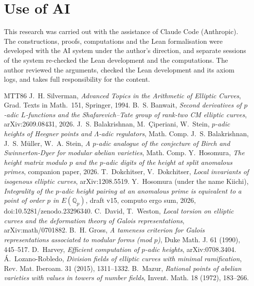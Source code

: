 \documentclass[11pt,a4paper]{amsart}
\newcommand{\Qp}{\mathbb{Q}_p}
\theoremstyle{plain}
\theoremstyle{definition}
\theoremstyle{remark}
\begin{document}
\section*{Use of AI}
This research was carried out with the assistance of Claude Code (Anthropic). The constructions, proofs, computations and the Lean formalisation were developed with the AI system under the author's direction, and separate sessions of the system re-checked the Lean development and the computations. The author reviewed the arguments, checked the Lean development and its axiom logs, and takes full responsibility for the content.

\begin{thebibliography}{MTT86}
 J.~H. Silverman, \emph{Advanced Topics in the Arithmetic of Elliptic Curves}, Grad. Texts in Math.~151, Springer, 1994.
 B.~S. Banwait, \emph{Second derivatives of $p$-adic $L$-functions and the Shafarevich--Tate group of rank-two CM elliptic curves}, arXiv:2609.08431, 2026.
 J.~S. Balakrishnan, M.~\c{C}iperiani, W.~Stein, \emph{$p$-adic heights of Heegner points and $\Lambda$-adic regulators}, Math. Comp.
 J.~S. Balakrishnan, J.~S. M\"uller, W.~A. Stein, \emph{A $p$-adic analogue of the conjecture of Birch and Swinnerton-Dyer for modular abelian varieties}, Math. Comp.
 Y.~Hosomura, \emph{The height matrix modulo $p$ and the $p$-adic digits of the height at split anomalous primes}, companion paper, 2026.
 T.~Dokchitser, V.~Dokchitser, \emph{Local invariants of isogenous elliptic curves}, arXiv:1208.5519.
 Y.~Hosomura (under the name Kiichi), \emph{Integrality of the $p$-adic height pairing at an anomalous prime is equivalent to a point of order $p$ in $E(\Qp)$}, draft v15, computo ergo sum, 2026, doi:10.5281/zenodo.23296340.
 C.~David, T.~Weston, \emph{Local torsion on elliptic curves and the deformation theory of Galois representations}, arXiv:math/0701882.
 B.~H. Gross, \emph{A tameness criterion for Galois representations associated to modular forms (mod $p$)}, Duke Math. J. 61 (1990), 445--517.
 D.~Harvey, \emph{Efficient computation of $p$-adic heights}, arXiv:0708.3404.
 \'A.~Lozano-Robledo, \emph{Division fields of elliptic curves with minimal ramification}, Rev. Mat. Iberoam. 31 (2015), 1311--1332.
 B.~Mazur, \emph{Rational points of abelian varieties with values in towers of number fields}, Invent. Math. 18 (1972), 183--266.

\end{thebibliography}
\end{document}
